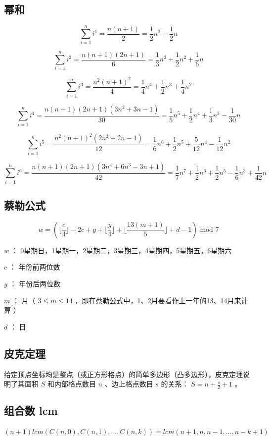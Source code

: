\documentclass{article}
\begin{document}
\subsection{幂和}

$$\sum\limits_{i=1}^{n}i^1 = \frac{n(n+1)}{2} = \frac{1}{2}n^2 + \frac{1}{2}n$$

$$\sum\limits_{i=1}^{n}i^2 = \frac{n(n+1)(2n+1)}{6} = \frac{1}{3}n^3 + \frac{1}{2}n^2 + \frac{1}{6}n$$

$$\sum\limits_{i=1}^{n}i^3 = \frac{n^2(n+1)^2}{4} = \frac{1}{4}n^4 + \frac{1}{2}n^3 + \frac{1}{4}n^2$$

$$\sum\limits_{i=1}^{n}i^4 = \frac{n(n+1)(2n+1)(3n^2+3n-1)}{30} = \frac{1}{5}n^5 + \frac{1}{2}n^4 + \frac{1}{3}n^3 - \frac{1}{30}n$$

$$\sum\limits_{i=1}^{n}i^5 = \frac{n^2(n+1)^2(2n^2+2n-1)}{12} = \frac{1}{6}n^6 + \frac{1}{2}n^5 + \frac{5}{12}n^4 - \frac{1}{12}n^2$$

$$\sum\limits_{i=1}^{n}i^6 = \frac{n(n+1)(2n+1)(3n^4+6n^3-3n+1)}{42} = \frac{1}{7}n^7 + \frac{1}{2}n^6 + \frac{1}{2}n^5 - \frac{1}{6}n^3 + \frac{1}{42}n$$


\subsection{蔡勒公式}

$$w = (\lfloor \frac{c}{4} \rfloor - 2c + y + \lfloor \frac{y}{4} \rfloor + \lfloor \frac{13(m+1)}{5} \rfloor + d - 1) \text{ mod } 7$$

$w$ ： 0星期日，1星期一，2星期二，3星期三，4星期四，5星期五，6星期六

$c$ ： 年份前两位数

$y$ ： 年份后两位数

$m$ ： 月（ $3 \leq m \leq 14$ ，即在蔡勒公式中，1、2月要看作上一年的13、14月来计算 ）

$d$ ： 日

\subsection{皮克定理}

给定顶点坐标均是整点（或正方形格点）的简单多边形（凸多边形），皮克定理说明了其面积 $S$ 和内部格点数目 $n$ 、边上格点数目 $s$ 的关系： $S = n + \frac{s}{2} + 1$ 。

\subsection{组合数 lcm}
$(n+1) lcm(C(n, 0), C(n,1),...,C(n,k)) = lcm(n+1, n, n-1, ..., n-k+1)$
\end{document}
